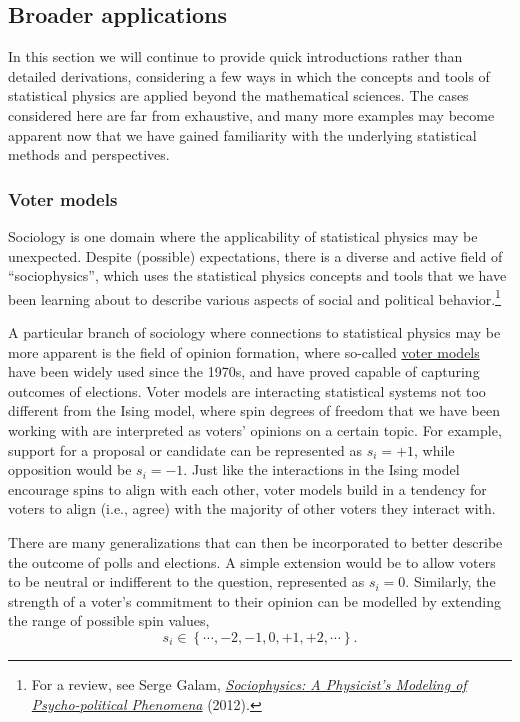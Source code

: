 \subsection{\label{sec:broad}Broader applications}
In this section we will continue to provide quick introductions rather than detailed derivations, considering a few ways in which the concepts and tools of statistical physics are applied beyond the mathematical sciences.
The cases considered here are far from exhaustive, and many more examples may become apparent now that we have gained familiarity with the underlying statistical methods and perspectives.

\subsubsection*{Voter models}
Sociology is one domain where the applicability of statistical physics may be unexpected.
Despite (possible) expectations, there is a diverse and active field of ``sociophysics'', which uses the statistical physics concepts and tools that we have been learning about to describe various aspects of social and political behavior.\footnote{For a review, see Serge Galam, \href{https://liverpool.idm.oclc.org/login?url=http://dx.doi.org/10.1007/978-1-4614-2032-3}{\textit{Sociophysics: A Physicist's Modeling of Psycho-political Phenomena}} (2012).}

A particular branch of sociology where connections to statistical physics may be more apparent is the field of opinion formation, where so-called \href{https://en.wikipedia.org/wiki/Voter_model}{voter models} have been widely used since the 1970s, and have proved capable of capturing outcomes of elections.
Voter models are interacting statistical systems not too different from the Ising model, where spin degrees of freedom that we have been working with are interpreted as voters' opinions on a certain topic.
For example, support for a proposal or candidate can be represented as $s_i = +1$, while opposition would be $s_i = -1$.
Just like the interactions in the Ising model encourage spins to align with each other, voter models build in a tendency for voters to align (i.e., agree) with the majority of other voters they interact with.

There are many generalizations that can then be incorporated to better describe the outcome of polls and elections.
A simple extension would be to allow voters to be neutral or indifferent to the question, represented as $s_i = 0$.
Similarly, the strength of a voter's commitment to their opinion can be modelled by extending the range of possible spin values,
\begin{equation*}
  s_i \in \left\{\cdots, -2, -1, 0, +1, +2, \cdots\right\}.
\end{equation*}

